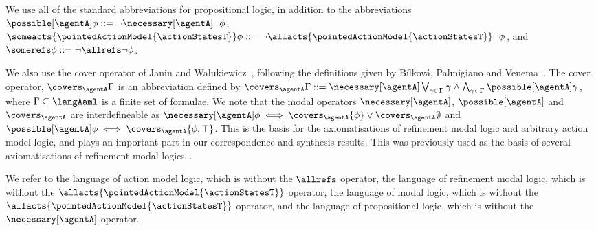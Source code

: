 \documentclass[twoside]{aiml14}
\begin{document}
  We use all of the standard abbreviations for propositional logic, in addition
  to the abbreviations 
  $\possible[\agentA] \phi ::= \neg \necessary[\agentA] \neg \phi$,
  $\someacts{\pointedActionModel{\actionStatesT}} \phi ::= \neg \allacts{\pointedActionModel{\actionStatesT}} \neg \phi$,
  and $\somerefs \phi ::= \neg \allrefs \neg \phi$.

  We also use the cover operator of Janin and Walukiewicz~\cite{janin1995},
  following the definitions given by B{\'i}lkov{\'a}, Palmigiano and
  Venema~\cite{bilkova2008}.  The cover operator, $\covers_\agentA \Gamma$ is
  an abbreviation defined by $\covers_\agentA \Gamma ::= \necessary[\agentA] \bigvee_{\gamma \in \Gamma} \gamma \land \bigwedge_{\gamma \in \Gamma} \possible[\agentA] \gamma$,
  where $\Gamma \subseteq \langAaml$ is a finite set of formulae.
  We note that the modal operators $\necessary[\agentA]$, $\possible[\agentA]$ and $\covers_\agentA$ are interdefineable
  as $\necessary[\agentA] \phi \iff \covers_\agentA \{\phi\} \lor \covers_\agentA \emptyset$ and $\possible[\agentA] \phi \iff \covers_\agentA \{\phi, \top\}$.
  This is the basis for the axiomatisations of refinement modal logic and
  arbitrary action model logic, and plays an important part in our correspondence
  and synthesis results.
  This was previously used as the basis of several axiomatisations
  of refinement modal logics~\cite{vanditmarsch2010,hales2011a,hales2011b,hales2012,bozzelli2012a,hales2013}.

  We refer to the language \langAml{} of action model logic, which is \langAaml{} without the $\allrefs$ operator,
  the language \langRml{} of refinement modal logic, which is \langAaml{} without the $\allacts{\pointedActionModel{\actionStatesT}}$ operator,
  the language \lang{} of modal logic, which is \langAml{} without the $\allacts{\pointedActionModel{\actionStatesT}}$ operator, 
  and the language \langP{} of propositional logic, which is \lang{} without the $\necessary[\agentA]$ operator.
\end{document}
